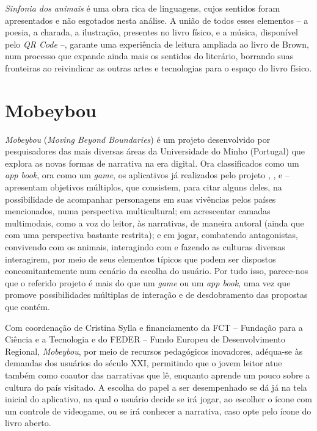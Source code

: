 \documentclass[portuguese]{textolivre}
\begin{document}
\textit{Sinfonia dos animais} é uma obra rica de linguagens, cujos sentidos
foram apresentados e não esgotados nesta análise. A união de todos esses
elementos – a poesia, a charada, a ilustração, presentes no livro físico, e a
música, disponível pelo \textit{QR Code} –, garante uma experiência de leitura
ampliada ao livro de Brown, num processo que expande ainda mais os sentidos do
literário, borrando suas fronteiras ao reivindicar as outras artes e
tecnologias para o espaço do livro físico.

\section{Mobeybou}\label{sec-formato}

\textit{Mobeybou} (\textit{Moving Beyond Boundaries}) é um projeto desenvolvido
por pesquisadores das mais diversas áreas da Universidade do Minho (Portugal)
que explora as novas formas de narrativa na era digital. Ora classificados como
um \textit{app book}, ora como um \textit{game}, os aplicativos já realizados
pelo projeto 
\textcite{mobeybou_india_2023}, 
\textcite{mobeybou_cabo_2023},
\textcite{mobeybou_brasil_2023-3} e \textcite{mobeybou_portugal_2023} --
apresentam objetivos múltiplos, que consistem, para citar alguns deles, na
possibilidade de acompanhar personagens em suas vivências pelos países
mencionados, numa perspectiva multicultural; em acrescentar camadas
multimodais, como a voz do leitor, às narrativas, de maneira autoral (ainda que
com uma perspectiva bastante restrita); e em jogar, combatendo antagonistas,
convivendo com os animais, interagindo com e fazendo as culturas diversas
interagirem, por meio de seus elementos típicos que podem ser dispostos
concomitantemente num cenário da escolha do usuário. Por tudo isso, parece-nos
que o referido projeto é mais do que um \textit{game} ou um \textit{app book},
uma vez que promove possibilidades múltiplas de interação e de desdobramento
das propostas que contém.

Com coordenação de Cristina Sylla e financiamento da FCT – Fundação para a
Ciência e a Tecnologia e do FEDER – Fundo Europeu de Desenvolvimento Regional,
\textit{Mobeybou}, por meio de recursos pedagógicos inovadores, adéqua-se às
demandas dos usuários do século XXI, permitindo que o jovem leitor atue também
como coautor das narrativas que lê, enquanto aprende um pouco sobre a cultura
do país visitado. A escolha do papel a ser desempenhado se dá já na tela
inicial do aplicativo, na qual o usuário decide se irá jogar, ao escolher o
ícone com um controle de videogame, ou se irá conhecer a narrativa, caso opte
pelo ícone do livro aberto. 
\end{document}
